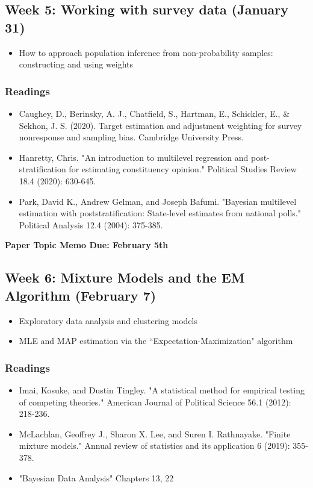 \documentclass[11pt, article, oneside]{memoir}
\theoremstyle{Assumption}
\begin{document}
\subsection{Week 5: Working with survey data (January 31)}

\begin{itemize}
\item How to approach population inference from non-probability samples: constructing and using weights
\end{itemize}

\subsubsection*{Readings}

\begin{itemize}
\item Caughey, D., Berinsky, A. J., Chatfield, S., Hartman, E., Schickler, E., \& Sekhon, J. S. (2020). Target estimation and adjustment weighting for survey nonresponse and sampling bias. Cambridge University Press.
\item Hanretty, Chris. "An introduction to multilevel regression and post-stratification for estimating constituency opinion." Political Studies Review 18.4 (2020): 630-645.
\item Park, David K., Andrew Gelman, and Joseph Bafumi. "Bayesian multilevel estimation with poststratification: State-level estimates from national polls." Political Analysis 12.4 (2004): 375-385.
\end{itemize}

\textbf{Paper Topic Memo Due: February 5th}

\subsection{Week 6: Mixture Models and the EM Algorithm (February 7)}

\begin{itemize}
\item Exploratory data analysis and clustering models
\item MLE and MAP estimation via the ``Expectation-Maximization" algorithm
\end{itemize}

\subsubsection*{Readings}

\begin{itemize}
\item Imai, Kosuke, and Dustin Tingley. "A statistical method for empirical testing of competing theories." American Journal of Political Science 56.1 (2012): 218-236.
\item McLachlan, Geoffrey J., Sharon X. Lee, and Suren I. Rathnayake. "Finite mixture models." Annual review of statistics and its application 6 (2019): 355-378.
\item "Bayesian Data Analysis" Chapters 13, 22
\end{itemize}
\end{document}
